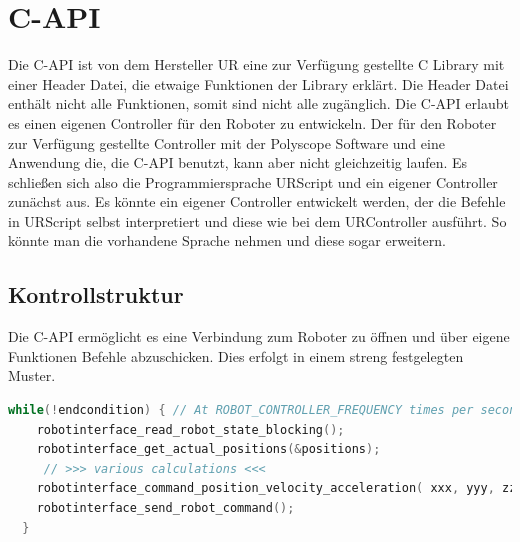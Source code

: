 \section{C-API}
\label{sec:rest_prinzip_gru}

Die C-\ac{API} ist von dem Hersteller \acs{UR} eine zur Verfügung gestellte C \acs{Library} mit einer Header Datei, die etwaige Funktionen der Library erklärt. Die Header Datei enthält nicht alle Funktionen, somit sind nicht alle zugänglich. Die C-\acs{API} erlaubt es einen eigenen Controller für den Roboter zu entwickeln. Der für den Roboter zur Verfügung gestellte Controller mit der Polyscope Software und eine Anwendung die, die C-\acs{API} benutzt, kann aber nicht gleichzeitig laufen. Es schließen sich also die Programmiersprache URScript und ein eigener Controller zunächst aus. Es könnte ein eigener Controller entwickelt werden, der die Befehle in URScript selbst interpretiert und diese wie bei dem URController ausführt. So könnte man die vorhandene Sprache nehmen und diese sogar erweitern.

\subsection{Kontrollstruktur}
\label{capi_control_loop_gru}	

Die C-\acs{API} ermöglicht es eine Verbindung zum Roboter zu öffnen und über eigene Funktionen Befehle abzuschicken. Dies erfolgt in einem streng festgelegten Muster.

\begin{lstlisting}[language=C,caption={Beispiel der Kontroll Struktur}, label=lst:robot_control_loop,captionpos=b]
  while(!endcondition) { // At ROBOT_CONTROLLER_FREQUENCY times per second
    robotinterface_read_robot_state_blocking();
    robotinterface_get_actual_positions(&positions);
     // >>> various calculations <<<
    robotinterface_command_position_velocity_acceleration( xxx, yyy, zzz);
    robotinterface_send_robot_command();
  }
\end{lstlisting}

